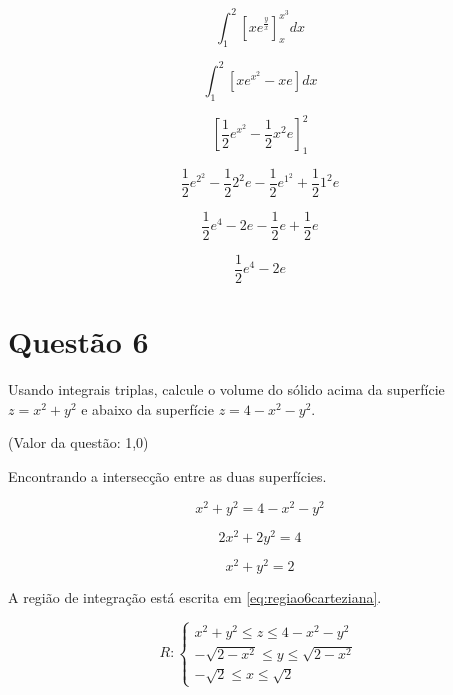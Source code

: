 \documentclass[10pt,a4paper]{article}
\begin{document}
	\begin{equation*}
		\int_{1}^{2} \left[ x e^{\frac{y}{x}} \right]_{x}^{x^3} dx
	\end{equation*}
	
	\begin{equation*}
		\int_{1}^{2} \left[ x e^{x^2} - x e \right] dx
	\end{equation*}
	
	\begin{equation*}
		\left[ \frac{1}{2}e^{x^2} - \frac{1}{2}x^2 e \right]_1^2
	\end{equation*}
	
	\begin{equation*}
		\frac{1}{2}e^{2^2} - \frac{1}{2}2^2 e - \frac{1}{2}e^{1^2} + \frac{1}{2}1^2 e
	\end{equation*}
	
	\begin{equation*}
		\frac{1}{2}e^4 - 2 e - \frac{1}{2}e + \frac{1}{2} e
	\end{equation*}
	
	\begin{equation*}
		\frac{1}{2}e^4 - 2 e
	\end{equation*}
	
	\section*{Questão 6}
	
	Usando integrais triplas, calcule o volume do sólido acima da superfície $ z = x^2 + y^2 $ e abaixo da superfície $ z = 4 - x^2 - y^2 $.
	
	(Valor da questão: 1,0)
	
	Encontrando a intersecção entre as duas superfícies.
	
	\begin{equation*}
		x^2 + y^2 = 4 - x^2 - y^2
	\end{equation*}
	
	\begin{equation*}
		2x^2 + 2y^2 = 4
	\end{equation*}
	
	\begin{equation*}
		x^2 + y^2 = 2
	\end{equation*}
	
	A região de integração está escrita em \ref{eq:regiao6carteziana}.
	
	\begin{equation}\label{eq:regiao6carteziana}
		R:
		\begin{cases}
			x^2 + y^2 \le z \le 4 - x^2 - y^2\\
			-\sqrt{2 - x^2} \le y \le \sqrt{2 - x^2}\\
			-\sqrt{2} \le x \le \sqrt{2}
		\end{cases}
	\end{equation}
	
\end{document}

